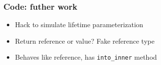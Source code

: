 \documentclass[xetex,mathserif,serif]{beamer}
\begin{document}
\begin{frame}
  \frametitle{Code: futher work}
  \pause
  \begin{itemize}[<+->]
    \item Hack to simulate lifetime parameterization
    \item Return reference or value? Fake reference type
    \item Behaves like reference, has \texttt{into\_inner} method
  \end{itemize}
\end{frame}
\end{document}
